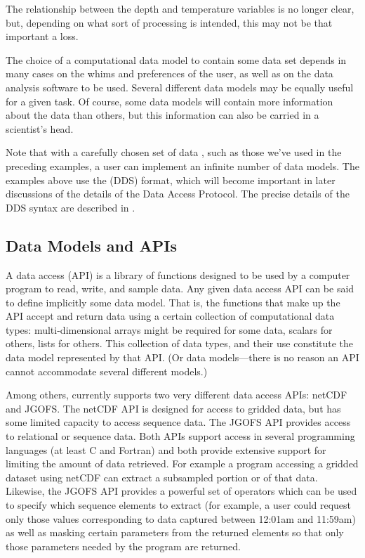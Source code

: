The relationship between the depth and temperature variables
is no longer clear, but, depending on what sort of processing is
intended, this may not be that important a loss.

The choice of a computational data model to contain some data set
depends in many cases on the whims and preferences of the user, as
well as on the data analysis software to be used. Several different
data models may be equally useful for a given task. Of course, some
data models will contain more information about the data than others,
but this information can also be carried in a scientist's head.

Note that with a carefully chosen set of data ,
such as those we've used in the preceding examples, a user can
implement an infinite number of data models.  The examples above use
the \opendap {} (DDS) format, which will
become important in later discussions of the details of the \opendap Data
Access Protocol. The precise details of the DDS syntax are described
in .

\subsection{Data Models and APIs}
\label{data,api}

A data access  (API) is a library
of functions designed to be used by a computer program to read, write,
and sample data. Any given data access API can be said to define
implicitly some data model. That is, the functions that make up the
API accept and return data using a certain collection of computational
data types: multi-dimensional arrays might be required for some data,
scalars for others, lists for others. This collection of data types,
and their use constitute the data model represented by that API. (Or
data models---there is no reason an API cannot accommodate several
different models.)

Among others, \opendap currently supports two very different data access
APIs: netCDF and JGOFS\@. The netCDF API is designed for access to
gridded data, but has some limited capacity to access sequence data.
The JGOFS API provides access to relational or sequence data.  Both
APIs support access in several programming languages (at least C and
Fortran) and both provide extensive support for limiting the amount of
data retrieved. For example a program accessing a gridded dataset
using netCDF can extract a subsampled portion or  of
that data.  Likewise, the JGOFS API provides a powerful set of
operators which can be used to specify which sequence elements to
extract (for example, a user could request only those values
corresponding to data captured between 12:01am and 11:59am) as well as
masking certain parameters from the returned elements so that only
those parameters needed by the program are returned.


